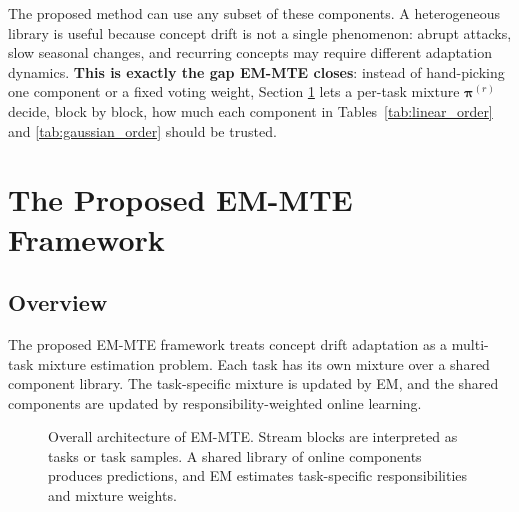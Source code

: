 ﻿\documentclass[12pt,a4paper]{article}
\begin{document}
The proposed method can use any subset of these components. A heterogeneous
library is useful because concept drift is not a single phenomenon: abrupt
attacks, slow seasonal changes, and recurring concepts may require different
adaptation dynamics. \textbf{This is exactly the gap EM-MTE closes}: instead
of hand-picking one component or a fixed voting weight, Section
\ref{sec:proposed} lets a per-task mixture $\boldsymbol{\pi}^{(r)}$ decide, block by
block, how much each component in Tables~\ref{tab:linear_order} and
\ref{tab:gaussian_order} should be trusted.

\section{The Proposed EM-MTE Framework}
\label{sec:proposed}
\subsection{Overview}
The proposed EM-MTE framework treats concept drift adaptation as a
multi-task mixture estimation problem. Each task has its own mixture over a
shared component library. The task-specific mixture is updated by EM, and
the shared components are updated by responsibility-weighted online
learning.

\begin{figure}[H]
\centering
{}
\caption{Overall architecture of EM-MTE. Stream blocks are interpreted as
tasks or task samples. A shared library of online components produces
predictions, and EM estimates task-specific responsibilities and mixture
weights.}
\label{fig:em_mte_overview}
\end{figure}
\end{document}
